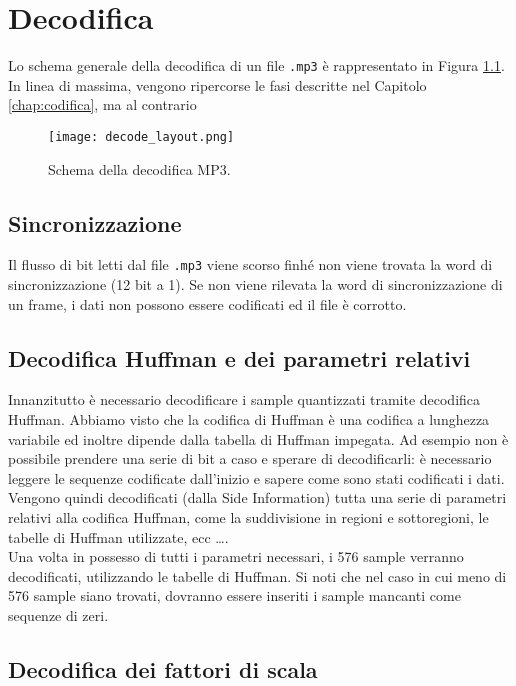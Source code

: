 \chapter{Decodifica} \label{chap:decodifica}
	
	Lo schema generale della decodifica di un file \texttt{.mp3} è rappresentato in Figura \ref{fig:decode_layout}. In linea di massima, vengono ripercorse le fasi descritte nel Capitolo \ref{chap:codifica}, ma al contrario
	
	\begin{figure}[h!]
		\centering
			\texttt{[image: decode\_layout.png]}
		\caption{Schema della decodifica MP3.}
		\label{fig:decode_layout}
	\end{figure}
	
	\section{Sincronizzazione} \label{sec:sincronizzazione}
		
		Il flusso di bit letti dal file \texttt{.mp3} viene scorso finhé non viene trovata la word di sincronizzazione (12 bit a 1). Se non viene rilevata la word di sincronizzazione di un frame, i dati non possono essere codificati ed il file è corrotto.
		
	\section{Decodifica Huffman e dei parametri relativi} \label{sec:decodifica_huffman}
		
		Innanzitutto è necessario decodificare i sample quantizzati tramite decodifica Huffman. Abbiamo visto che la codifica di Huffman è una codifica a lunghezza variabile ed inoltre dipende dalla tabella di Huffman impegata. Ad esempio non è possibile prendere una serie di bit a caso e sperare di decodificarli: è necessario leggere le sequenze codificate dall'inizio e sapere come sono stati codificati i dati. Vengono quindi decodificati (dalla Side Information) tutta una serie di parametri relativi alla codifica Huffman, come la suddivisione in regioni e sottoregioni, le tabelle di Huffman utilizzate, ecc \dots.\\
		Una volta in possesso di tutti i parametri necessari, i 576 sample verranno decodificati, utilizzando le tabelle di Huffman. Si noti che nel caso in cui meno di 576 sample siano trovati, dovranno essere inseriti i sample mancanti come sequenze di zeri.
		
	\section{Decodifica dei fattori di scala} \label{sec:decodifica_fattori_scala}
		
